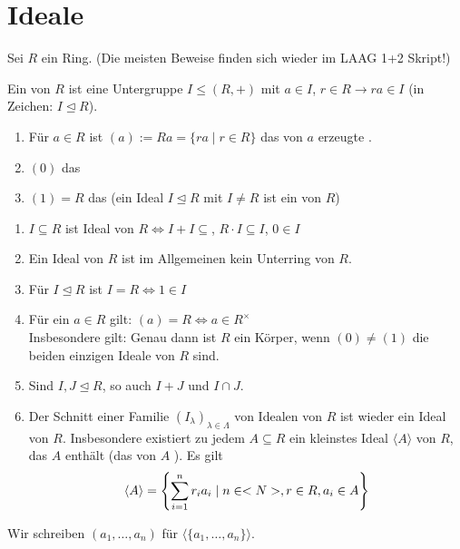 \section{Ideale}

Sei $R$ ein Ring. (Die meisten Beweise finden sich wieder im LAAG 1+2 Skript!)

\begin{definition}[Ideal]
	Ein  von $R$ ist eine Untergruppe $I \leq (R,+)$ mit $a \in I$, $r \in R \to ra \in I$ (in Zeichen: $I \unlhd R$).
\end{definition}

\begin{example}
	\begin{enumerate}[label=(\alph*)]
		\item Für $a \in R$ ist $(a) := Ra = \{ra \mid r \in R\}$ das von $a$ erzeugte .
		\item $(0)$ das 
		\item $(1) = R$ das  (ein Ideal $I \unlhd R$ mit $I \neq R$ ist ein   von $R$) 
	\end{enumerate}
\end{example}

\begin{remark}
	\begin{enumerate}[label=(\alph*)]
		\item $I \subseteq R$ ist Ideal von $R \Leftrightarrow I + I \subseteq$, $R \cdot I \subseteq I$, $0 \in I$
		\item Ein Ideal von $R$ ist im Allgemeinen kein Unterring von $R$.
		\item Für $I \unlhd R$ ist $I = R \Leftrightarrow 1 \in I$
		\item Für ein $a \in R$ gilt: $(a) = R \Leftrightarrow a \in R^{\times}$\\
		Insbesondere gilt: Genau dann ist $R$ ein Körper, wenn $(0) \neq (1)$ die beiden einzigen Ideale von $R$ sind.
		\item Sind $I,J \unlhd R$, so auch $I + J$ und $I \cap J$.
		\item Der Schnitt einer Familie $(I_\lambda)_{\lambda \in \Lambda}$ von Idealen von $R$ ist wieder ein Ideal von $R$. Insbesondere existiert zu jedem $A \subseteq R$ ein kleinstes Ideal $\langle A \rangle$ von $R$, das $A$ enthält (das von $A$ ). Es gilt
		\begin{align}
			\langle A \rangle = \left\{ \sum_{i=1}^{n} r_i a_i \mid n \in <N>, r \in R, a_i \in A\right\} \notag
		\end{align}
	\end{enumerate}
	Wir schreiben $(a_1, \dots, a_n)$ für $\langle\{ a_1, \dots, a_n \}\rangle$.
\end{remark}

